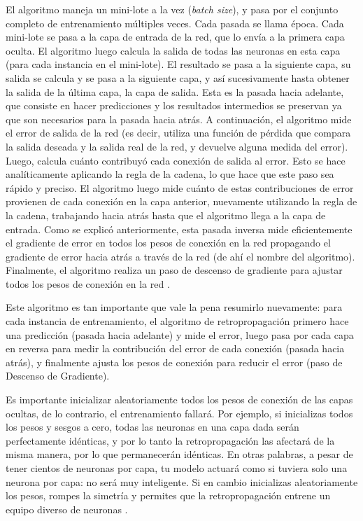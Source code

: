 El algoritmo maneja un mini-lote a la vez (\textit{batch size}), y pasa por el conjunto completo de entrenamiento múltiples veces. Cada pasada se llama época. Cada mini-lote se pasa a la capa de entrada de la red, que lo envía a la primera capa oculta. El algoritmo luego calcula la salida de todas las neuronas en esta capa (para cada instancia en el mini-lote). El resultado se pasa a la siguiente capa, su salida se calcula y se pasa a la siguiente capa, y así sucesivamente hasta obtener la salida de la última capa, la capa de salida. Esta es la pasada hacia adelante, que consiste  en hacer predicciones y los resultados intermedios se preservan ya que son necesarios para la pasada hacia atrás. A continuación, el algoritmo mide el error de salida de la red (es decir, utiliza una función de pérdida que compara la salida deseada y la salida real de la red, y devuelve alguna medida del error). Luego, calcula cuánto contribuyó cada conexión de salida al error. Esto se hace analíticamente aplicando la regla de la cadena, lo que hace que este paso sea rápido y preciso. El algoritmo luego mide cuánto de estas contribuciones de error provienen de cada conexión en la capa anterior, nuevamente utilizando la regla de la cadena, trabajando hacia atrás hasta que el algoritmo llega a la capa de entrada. Como se explicó anteriormente, esta pasada inversa mide eficientemente el gradiente de error en todos los pesos de conexión en la red propagando el gradiente de error hacia atrás a través de la red (de ahí el nombre del algoritmo). Finalmente, el algoritmo realiza un paso de descenso de gradiente para ajustar todos los pesos de conexión en la red \citep{geron2022hands}.

Este algoritmo es tan importante que vale la pena resumirlo nuevamente: para cada instancia de entrenamiento, el algoritmo de retropropagación primero hace una predicción (pasada hacia adelante) y mide el error, luego pasa por cada capa en reversa para medir la contribución del error de cada conexión (pasada hacia atrás), y finalmente ajusta los pesos de conexión para reducir el error (paso de Descenso de Gradiente).

Es importante inicializar aleatoriamente todos los pesos de conexión de las capas ocultas, de lo contrario, el entrenamiento fallará. Por ejemplo, si inicializas todos los pesos y sesgos a cero, todas las neuronas en una capa dada serán perfectamente idénticas, y por lo tanto la retropropagación las afectará de la misma manera, por lo que permanecerán idénticas. En otras palabras, a pesar de tener cientos de neuronas por capa, tu modelo actuará como si tuviera solo una neurona por capa: no será muy inteligente. Si en cambio inicializas aleatoriamente los pesos, rompes la simetría y permites que la retropropagación entrene un equipo diverso de neuronas \citep{geron2022hands}.

